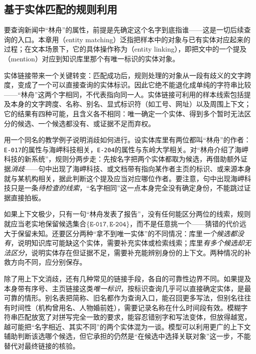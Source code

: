 \subsection{基于实体匹配的规则利用}
\label{sec:rule-based-knowledge-acquisition-entity-matching}

要查询新闻中“林舟”的属性，前提是先确定这个名字到底指谁——这是一切后续查询的入口。本章用（entity matching）泛指把样本中的对象与已有实体对应起来的过程；在文本场景下，它的具体操作称为（entity linking），即把文中的一个提及（mention）对应到知识库里那个有唯一标识的实体对象。

实体链接带来一个关键转变：匹配成功后，规则处理的对象从一段有歧义的文字跨度，变成了一个可以直接查询的实体标识。因此它绝不能退化成单纯的字符串比较——“林舟”这两个字相同，不代表指向同一人。实体链接可利用的样本线索包括提及本身的文字跨度、名称、别名、显式标识符（如工号、网址）以及周围上下文；它的结果有四种可能，且含义各不相同：唯一确定一个实体、得到多个暂时无法区分的候选、一个候选都没有、或证据不足而弃权。

用一个同名的教学例子说明消歧如何进行。设实体库里有两位都叫“林舟”的作者：\texttt{E-017}的属性与海岬科技相关，\texttt{E-204}的属性与东岭大学相关。对“林舟介绍了海岬科技的新系统”，规则分两步走：先按名字把两个实体都取为候选，再借助额外证据\emph{消歧}——句中出现了海岬科技、或文档带有指向某作者主页的标识、或来源本身就与某机构相关，据此判断这个提及应当对应哪位作者。要注意，句中出现海岬科技只是一条\emph{待检查的线索}，“名字相同”这一点本身完全没有确定身份，不能跳过证据直接拍板。

如果上下文极少，只有一句“林舟发表了报告”，没有任何能区分两位的线索，规则就应当老实地保留候选集合$\{\texttt{E-017},\texttt{E-204}\}$，而不是任意挑一个——猜错的代价远大于保留未知。还要区分两种“拿不到唯一实体”的不同情况：库里\emph{一个候选都没有}，说明知识库可能缺这个实体，需要补充实体或检索线索；库里\emph{有多个候选却无法区分}，说明实体存在但证据不足，需要补充能辨别身份的上下文。两种情况的补救方向不同，应分别保存。

除了用上下文消歧，还有几种常见的链接手段，各自的可靠性边界不同。如果提及本身带有序号、主页链接这类\emph{唯一标识}，按标识查询几乎可以直接确定实体，是最可靠的情形。别名表把简称、旧名都作为查询入口，能召回更多写法，但别名往往有时间性（机构曾用名、人物婚前姓），需要记录名称在什么时间段有效。模糊字符串匹配放宽了对拼写完全一致的要求，能容忍错别字和写法变体，但放得越宽，越可能把“名字相近、其实不同”的两个实体混为一谈。模型可以利用更广的上下文辅助判断该选哪个候选，但它承担的仍然是“在候选中选择关联对象”这一步，不能替代对最终链接的核验。

